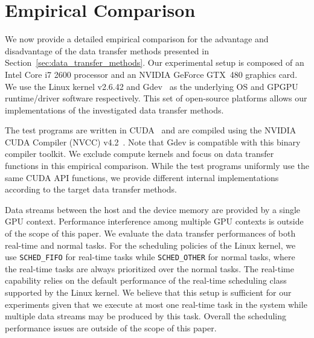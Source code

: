 \section{Empirical Comparison}
\label{sec:empirical_comparison}

We now provide a detailed empirical comparison for the advantage and
disadvantage of the data transfer methods presented in
Section~\ref{sec:data_transfer_methods}.
Our experimental setup is composed of an Intel Core i7 2600 processor
and an NVIDIA GeForce GTX~480 graphics card.
We use the Linux kernel v2.6.42 and Gdev~\cite{Kato_ATC12} as the
underlying OS and GPGPU runtime/driver software respectively.
This set of open-source platforms allows our implementations of the
investigated data transfer methods.

The test programs are written in CUDA~\cite{NVIDIA_CUDA} and are compiled
using the NVIDIA CUDA Compiler (NVCC) v4.2~\cite{NVIDIA_NVCC}.
Note that Gdev is compatible with this binary compiler toolkit.
We exclude compute kernels and focus on data transfer functions in this
empirical comparison.
While the test programs uniformly use the same CUDA API functions, we
provide different internal implementations according to the target data
transfer methods.

Data streams between the host and the device memory are provided by a
single GPU context.
Performance interference among multiple GPU contexts is outside of the
scope of this paper.
We evaluate the data transfer performances of both real-time and normal
tasks.
For the scheduling policies of the Linux kernel, we use
\texttt{SCHED\_FIFO} for real-time tasks while \texttt{SCHED\_OTHER} for
normal tasks, where the real-time tasks are always prioritized over the
normal tasks.
The real-time capability relies on the default performance of the
real-time scheduling class supported by the Linux kernel.
We believe that this setup is sufficient for our experiments given that
we execute at most one real-time task in the system while multiple data
streams may be produced by this task.
Overall the scheduling performance issues are outside of the scope of
this paper.

